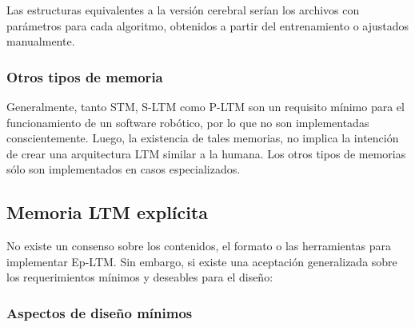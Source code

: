 Las estructuras equivalentes a la versi\'on cerebral ser\'ian los archivos con par\'ametros para cada algoritmo, obtenidos a partir del entrenamiento o ajustados manualmente.


\subsubsection{Otros tipos de memoria}

Generalmente, tanto STM, S-LTM como P-LTM son un requisito m\'inimo para el funcionamiento de un software rob\'otico, por lo que no son implementadas conscientemente. Luego, la existencia de tales memorias, no implica la intenci\'on de crear una arquitectura LTM similar a la humana. Los otros tipos de memorias s\'olo son implementados en casos especializados.



\subsection{Memoria LTM expl\'icita}\label{sec:ltm_exp}



No existe un consenso sobre los contenidos, el formato o las herramientas para implementar Ep-LTM.
Sin embargo, si existe una aceptaci\'on generalizada sobre los requerimientos m\'inimos y deseables para el dise\~no\cite{Vijayakumar2014}\cite{Ho2009}\cite{Stachowicz2012}\cite{Jockel2008}:

\subsubsection{Aspectos de dise\~no m\'inimos}



